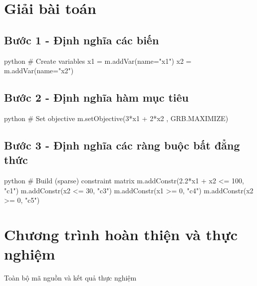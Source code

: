 \section{Giải bài toán}

\subsection{Bước 1 - Định nghĩa các biến}

\begin{mintedbox}{python}
# Create variables
x1 = m.addVar(name="x1")
x2 = m.addVar(name="x2")
\end{mintedbox}

\subsection{Bước 2 - Định nghĩa hàm mục tiêu}

\begin{mintedbox}{python}
# Set objective
m.setObjective(3*x1 + 2*x2 , GRB.MAXIMIZE)
\end{mintedbox}

\subsection{Bước 3 - Định nghĩa các ràng buộc bất đẳng thức}

\begin{mintedbox}{python}
# Build (sparse) constraint matrix
m.addConstr(2.2*x1 + x2  <= 100, "c1")
m.addConstr(x2  <= 30, "c3")
m.addConstr(x1  >= 0, "c4")
m.addConstr(x2  >= 0, "c5")
\end{mintedbox}

\section{Chương trình hoàn thiện và thực nghiệm}

Toàn bộ mã nguồn và kết quả thực nghiệm


